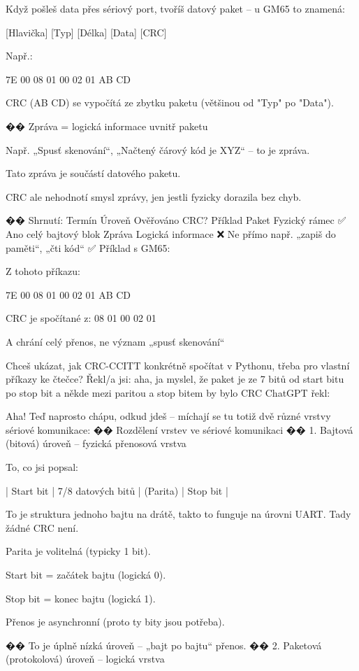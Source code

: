     Když pošleš data přes sériový port, tvoříš datový paket – u GM65 to znamená:

[Hlavička] [Typ] [Délka] [Data] [CRC]

Např.:

    7E 00 08 01 00 02 01 AB CD

    CRC (AB CD) se vypočítá ze zbytku paketu (většinou od "Typ" po "Data").

�� Zpráva = logická informace uvnitř paketu

    Např. „Spusť skenování“, „Načtený čárový kód je XYZ“ – to je zpráva.

    Tato zpráva je součástí datového paketu.

    CRC ale nehodnotí smysl zprávy, jen jestli fyzicky dorazila bez chyb.

�� Shrnutí:
Termín	Úroveň	Ověřováno CRC?	Příklad
Paket	Fyzický rámec	✅ Ano	celý bajtový blok
Zpráva	Logická informace	❌ Ne přímo	např. „zapiš do paměti“, „čti kód“
✅ Příklad s GM65:

Z tohoto příkazu:

7E 00 08 01 00 02 01 AB CD

    CRC je spočítané z: 08 01 00 02 01

    A chrání celý přenos, ne význam „spusť skenování“

Chceš ukázat, jak CRC-CCITT konkrétně spočítat v Pythonu, třeba pro vlastní příkazy ke čtečce?
Řekl/a jsi:
aha, ja myslel, že paket je ze 7 bitů od start bitu po stop bit a někde mezi paritou a stop bitem by bylo CRC
ChatGPT řekl:

Aha! Teď naprosto chápu, odkud jdeš – míchají se tu totiž dvě různé vrstvy sériové komunikace:
�� Rozdělení vrstev ve sériové komunikaci
�� 1. Bajtová (bitová) úroveň – fyzická přenosová vrstva

To, co jsi popsal:

| Start bit | 7/8 datových bitů | (Parita) | Stop bit |

To je struktura jednoho bajtu na drátě, takto to funguje na úrovni UART. Tady žádné CRC není.

    Parita je volitelná (typicky 1 bit).

    Start bit = začátek bajtu (logická 0).

    Stop bit = konec bajtu (logická 1).

    Přenos je asynchronní (proto ty bity jsou potřeba).

�� To je úplně nízká úroveň – „bajt po bajtu“ přenos.
�� 2. Paketová (protokolová) úroveň – logická vrstva

